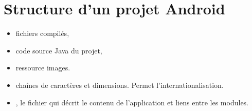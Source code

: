\section{Structure d'un projet Android}
\begin{itemize}
    \item {} fichiers compilés,
    \item {} code source Java du projet,
    \item {} ressource images.
    \item {} chaînes de caractères et dimensions. Permet l'internationalisation.
    \item {}, le fichier qui décrit le contenu de l'application et liens entre les modules.
\end{itemize}
